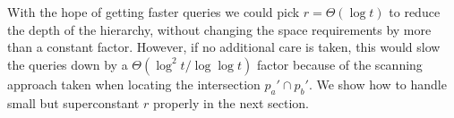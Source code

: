 With the hope of getting faster queries we could pick \(r = \Theta(\log
t)\) to reduce the depth of the hierarchy, without changing the
space requirements by more than a constant factor.
However, if no additional care is taken, this would slow the queries down by a
\(\Theta(\log^2 t / \log \log t)\) factor because of the scanning approach
taken when locating the intersection \(p_a' \cap p_b'\). We show how to handle
small but superconstant \(r\) properly in the next section.
